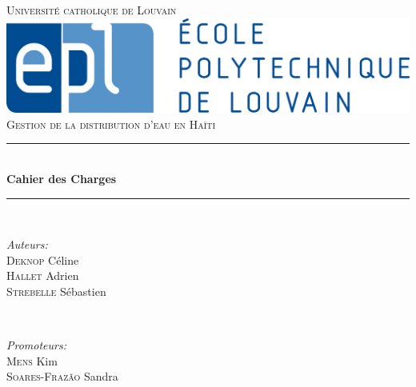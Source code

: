 \documentclass[a4paper, 11pt]{article}
\begin{document}
\begin{titlepage}

\newcommand{\HRule}{\rule{\linewidth}{0.5mm}} %

\center %

\textsc{\LARGE Université catholique de Louvain }\\[2cm] %
\includegraphics[scale=0.45]{Cahier_des_Charges/epl.jpg}
 \\[1cm]
\textsc{\large Gestion de la distribution d'eau en Haïti}\\[1cm] %


\HRule \\[0.4cm]
{ \huge \bfseries Cahier des Charges}\\[0.4cm] %
\HRule \\[10cm]


\begin{minipage}[t]{0.4\textwidth}
\begin{flushleft} \large
\emph{Auteurs:}\\
\textsc{Deknop} Céline \\
\textsc{Hallet} Adrien \\
\textsc{Strebelle} Sébastien \\
\end{flushleft}
\end{minipage}
~
\begin{minipage}[t]{0.4\textwidth}
\begin{flushright} \large
\emph{Promoteurs:} \\
\textsc{Mens} Kim \\
 \textsc{Soares-Frazão} Sandra \\%
\end{flushright}
\end{minipage}\\[1cm]


\end{titlepage}
\end{document}
